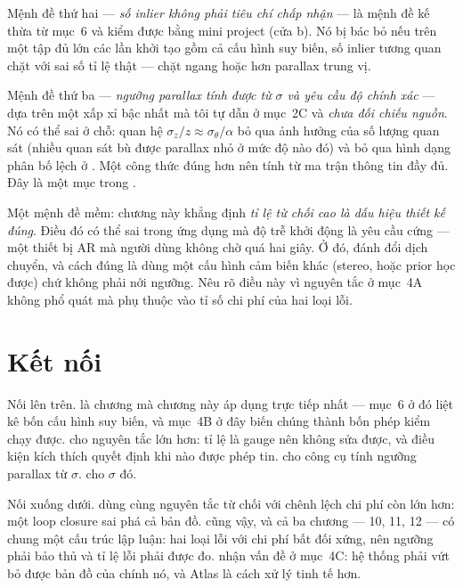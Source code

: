 \documentclass[../../vslam.tex]{subfiles}
\begin{document}
Mệnh đề thứ hai --- \emph{số inlier không phải tiêu chí chấp nhận} --- là mệnh đề kế thừa từ  mục~6 và kiểm được bằng mini project (cửa b). Nó bị bác bỏ nếu trên một tập đủ lớn các lần khởi tạo gồm cả cấu hình suy biến, số inlier tương quan chặt với sai số tỉ lệ thật --- chặt ngang hoặc hơn parallax trung vị.

Mệnh đề thứ ba --- \emph{ngưỡng parallax tính được từ \(\sigma\) và yêu cầu độ chính xác} --- dựa trên một xấp xỉ bậc nhất mà tôi tự dẫn ở mục~2C và \emph{chưa đối chiếu nguồn}. Nó có thể sai ở chỗ: quan hệ \(\sigma_z/z \approx \sigma_\theta/\alpha\) bỏ qua ảnh hưởng của số lượng quan sát (nhiều quan sát bù được parallax nhỏ ở mức độ nào đó) và bỏ qua hình dạng phân bố lệch ở . Một công thức đúng hơn nên tính từ ma trận thông tin đầy đủ. Đây là một mục trong .

Một mệnh đề mềm: chương này khẳng định \emph{tỉ lệ từ chối cao là dấu hiệu thiết kế đúng}. Điều đó có thể sai trong ứng dụng mà độ trễ khởi động là yêu cầu cứng --- một thiết bị AR mà người dùng không chờ quá hai giây. Ở đó, đánh đổi dịch chuyển, và cách đúng là dùng một cấu hình cảm biến khác (stereo, hoặc prior học được) chứ không phải nới ngưỡng. Nêu rõ điều này vì nguyên tắc ở mục~4A không phổ quát mà phụ thuộc vào tỉ số chi phí của hai loại lỗi.

\section{Kết nối}

Nối lên trên.  là chương mà chương này áp dụng trực tiếp nhất --- mục~6 ở đó liệt kê bốn cấu hình suy biến, và mục~4B ở đây biến chúng thành bốn phép kiểm chạy được.  cho nguyên tắc lớn hơn: tỉ lệ là gauge nên không sửa được, và điều kiện kích thích quyết định khi nào được phép tin.  cho công cụ tính ngưỡng parallax từ \(\sigma\).  cho \(\sigma\) đó.

Nối xuống dưới.  dùng cùng nguyên tắc từ chối với chênh lệch chi phí còn lớn hơn: một loop closure sai phá cả bản đồ.  cũng vậy, và cả ba chương --- 10, 11, 12 --- có chung một cấu trúc lập luận: hai loại lỗi với chi phí bất đối xứng, nên ngưỡng phải bảo thủ và tỉ lệ lỗi phải được đo.  nhận vấn đề ở mục~4C: hệ thống phải vứt bỏ được bản đồ của chính nó, và Atlas là cách xử lý tinh tế hơn.
\end{document}

